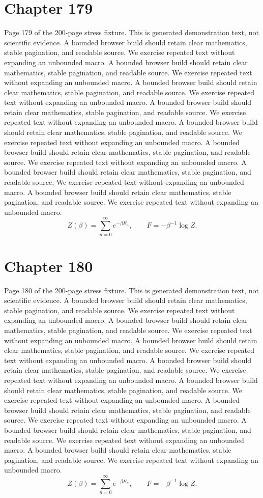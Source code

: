 \documentclass[11pt]{article}
\begin{document}
\section*{Chapter 179}
Page 179 of the 200-page stress fixture. This is generated demonstration text, not scientific evidence.
A bounded browser build should retain clear mathematics, stable pagination, and readable source. We exercise repeated text without expanding an unbounded macro.
A bounded browser build should retain clear mathematics, stable pagination, and readable source. We exercise repeated text without expanding an unbounded macro.
A bounded browser build should retain clear mathematics, stable pagination, and readable source. We exercise repeated text without expanding an unbounded macro.
A bounded browser build should retain clear mathematics, stable pagination, and readable source. We exercise repeated text without expanding an unbounded macro.
A bounded browser build should retain clear mathematics, stable pagination, and readable source. We exercise repeated text without expanding an unbounded macro.
A bounded browser build should retain clear mathematics, stable pagination, and readable source. We exercise repeated text without expanding an unbounded macro.
A bounded browser build should retain clear mathematics, stable pagination, and readable source. We exercise repeated text without expanding an unbounded macro.
A bounded browser build should retain clear mathematics, stable pagination, and readable source. We exercise repeated text without expanding an unbounded macro.
\[Z(\beta)=\sum_{n=0}^{\infty}e^{-\beta E_n},\qquad F=-\beta^{-1}\log Z.\]
\newpage
\section*{Chapter 180}
Page 180 of the 200-page stress fixture. This is generated demonstration text, not scientific evidence.
A bounded browser build should retain clear mathematics, stable pagination, and readable source. We exercise repeated text without expanding an unbounded macro.
A bounded browser build should retain clear mathematics, stable pagination, and readable source. We exercise repeated text without expanding an unbounded macro.
A bounded browser build should retain clear mathematics, stable pagination, and readable source. We exercise repeated text without expanding an unbounded macro.
A bounded browser build should retain clear mathematics, stable pagination, and readable source. We exercise repeated text without expanding an unbounded macro.
A bounded browser build should retain clear mathematics, stable pagination, and readable source. We exercise repeated text without expanding an unbounded macro.
A bounded browser build should retain clear mathematics, stable pagination, and readable source. We exercise repeated text without expanding an unbounded macro.
A bounded browser build should retain clear mathematics, stable pagination, and readable source. We exercise repeated text without expanding an unbounded macro.
A bounded browser build should retain clear mathematics, stable pagination, and readable source. We exercise repeated text without expanding an unbounded macro.
\[Z(\beta)=\sum_{n=0}^{\infty}e^{-\beta E_n},\qquad F=-\beta^{-1}\log Z.\]
\newpage
\end{document}
